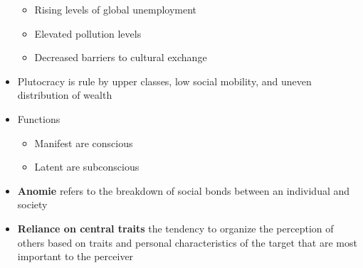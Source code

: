 \documentclass[11pt]{article}
\begin{document}
\begin{itemize}
\begin{itemize}
      \item Rising levels of global unemployment
      \item Elevated pollution levels
      \item Decreased barriers to cultural exchange
    \end{itemize}
  \item Plutocracy is rule by upper classes, low social mobility, and uneven
    distribution of wealth
  \item Functions
    \begin{itemize}
      \item Manifest are conscious
      \item Latent are subconscious
    \end{itemize}
  \item \textbf{Anomie} refers to the breakdown of social bonds between an
    individual and society
  \item \textbf{Reliance on central traits} the tendency to organize the
    perception of others based on traits and personal characteristics of the
    target that are most important to the perceiver 
\end{itemize}
\end{document}
